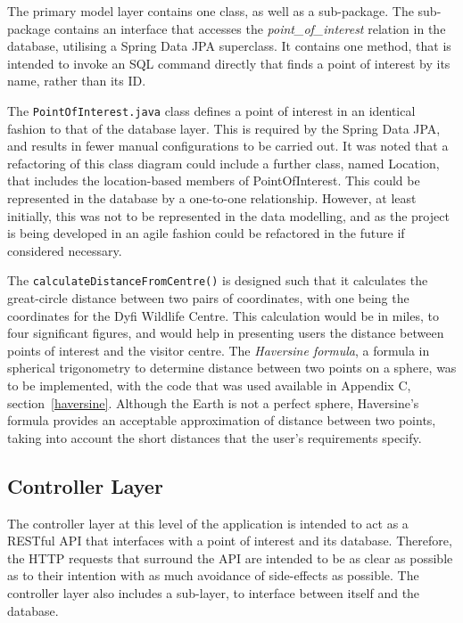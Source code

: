 The primary model layer contains one class, as well as a sub-package. The sub-package contains an interface that accesses the \textit{point\_of\_interest} relation in the database, utilising a Spring Data JPA superclass. It contains one method, that is intended to invoke an SQL command directly that finds a point of interest by its name, rather than its ID.

The \texttt{PointOfInterest.java} class defines a point of interest in an identical fashion to that of the database layer. This is required by the Spring Data JPA, and results in fewer manual configurations to be carried out. It was noted that a refactoring of this class diagram could include a further class, named Location, that includes the location-based members of PointOfInterest. This could be represented in the database by a one-to-one relationship. However, at least initially, this was not to be represented in the data modelling, and as the project is being developed in an agile fashion could be refactored in the future if considered necessary.

The \texttt{calculateDistanceFromCentre()} is designed such that it calculates the great-circle distance between two pairs of coordinates, with one being the coordinates for the Dyfi Wildlife Centre. This calculation would be in miles, to four significant figures, and would help in presenting users the distance between points of interest and the visitor centre. The \textit{Haversine formula}, a formula in spherical trigonometry to determine distance between two points on a sphere, was to be implemented, with the code that was used available in Appendix C, section~\ref{haversine}. Although the Earth is not a perfect sphere, Haversine's formula provides an acceptable approximation of distance between two points, taking into account the short distances that the user's requirements specify.

\subsection{Controller Layer}

The controller layer at this level of the application is intended to act as a RESTful API that interfaces with a point of interest and its database. Therefore, the HTTP requests that surround the API are intended to be as clear as possible as to their intention with as much avoidance of side-effects as possible. The controller layer also includes a sub-layer, to interface between itself and the database.

